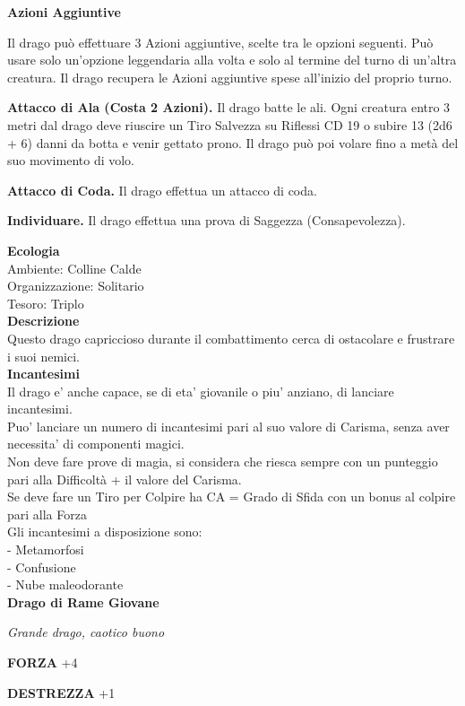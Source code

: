 \begin{multicols}{2}
\textbf{Azioni Aggiuntive}

Il drago può effettuare 3 Azioni aggiuntive, scelte tra le opzioni seguenti. Può usare solo un'opzione leggendaria alla volta e solo al termine del turno di un'altra creatura. Il drago recupera le Azioni aggiuntive spese all'inizio del proprio turno.

\textbf{Attacco di Ala (Costa 2 Azioni).} Il drago batte le ali. Ogni creatura entro 3 metri dal drago deve riuscire un Tiro Salvezza su Riflessi CD 19 o subire 13 (2d6 + 6) danni da botta e venir gettato prono. Il drago può poi volare fino a metà del suo movimento di volo.

\textbf{Attacco di Coda.} Il drago effettua un attacco di coda. 

\textbf{Individuare.} Il drago effettua una prova di Saggezza (Consapevolezza).

\textbf{Ecologia}\\
Ambiente: Colline Calde\\
Organizzazione: Solitario\\
Tesoro: Triplo\\
\textbf{Descrizione}\\
Questo drago capriccioso durante il combattimento cerca di ostacolare e frustrare i suoi nemici.\\
\textbf{Incantesimi}\\
Il drago e' anche capace, se di eta' giovanile o piu' anziano, di lanciare incantesimi.\\
Puo' lanciare un numero di incantesimi pari al suo valore di Carisma, senza aver necessita' di componenti magici.\\
Non deve fare prove di magia, si considera che riesca sempre con un punteggio pari alla Difficoltà + il valore del Carisma.\\
Se deve fare un Tiro per Colpire ha CA = Grado di Sfida con un bonus al colpire pari alla Forza\\
Gli incantesimi a disposizione sono:\\
- Metamorfosi\\
- Confusione\\
- Nube maleodorante\\


\medskip{}\textbf{Drago di Rame Giovane}

\emph{Grande drago, caotico buono}

\textbf{FORZA} +4

\textbf{DESTREZZA} +1


\end{multicols}
